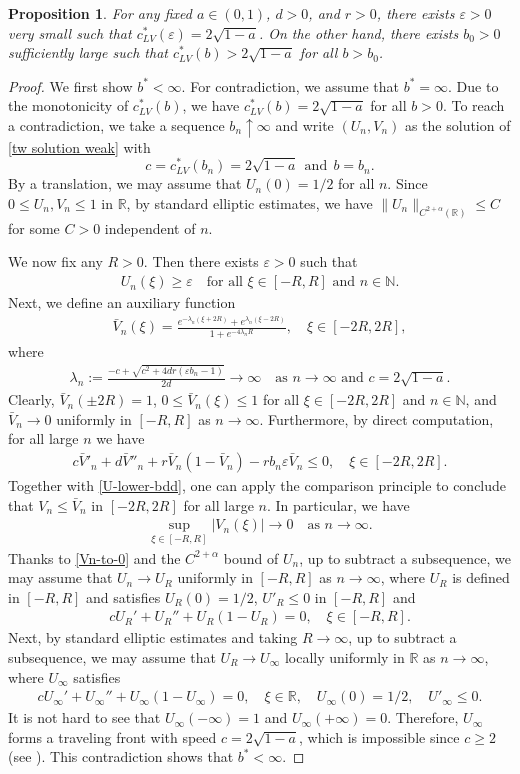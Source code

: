\documentclass[11pt,a4paper]{article}
\newtheorem{proposition}[theorem]{\textbf{Proposition}}
\numberwithin{equation}{section}
\numberwithin{figure}{section}
\newcommand\bea{\begin{eqnarray}}
\newcommand\eea{\end{eqnarray}}
\newcommand\beaa{\begin{eqnarray*}}
\newcommand\eeaa{\end{eqnarray*}}
\begin{document}
\begin{proposition}\label{prop:0<b*<infty}
For any fixed $a\in(0,1)$, $d>0$, and $r>0$, there exists $\varepsilon>0$ very small such that $c_{LV}^{*}(\varepsilon)=2\sqrt{1-a}$. On the other hand, there exists $b_0>0$ sufficiently large such that $c_{LV}^{*}(b)>2\sqrt{1-a}$ for all $b>b_0$.
\end{proposition}
\begin{proof}
We first show $b^*<\infty$.
For contradiction, we assume that $b^*=\infty$.
Due to the monotonicity of $c_{LV}^{*}(b)$, we have $c_{LV}^{*}(b)=2\sqrt{1-a}$ for all $b>0$.
To reach a contradiction, we take a sequence $b_n\uparrow \infty$ and write $(U_n,V_n)$ as the solution of \eqref{tw solution weak} with 
$$c=c_{LV}^{*}(b_n)=2\sqrt{1-a}\ \ \text{and}\ \ b=b_n.$$
By a translation, we may assume that $U_n(0)=1/2$ for all $n$.
Since $0\leq U_n,V_n\leq 1$ in $\mathbb{R}$, by standard elliptic estimates, we have
$\|U_n\|_{C^{2+\alpha}(\mathbb{R})}\leq C$ for some $C>0$ independent of $n$.

We now fix any $R>0$. Then there exists $\varepsilon>0$ such that
\bea\label{U-lower-bdd}
U_n(\xi)\geq \varepsilon\quad \mbox{for all $\xi\in[-R,R]$ and $n\in\mathbb{N}$}.
\eea
Next, we define an auxiliary function
\beaa
\bar{V}_n(\xi)=\frac{e^{-\lambda_n(\xi+2R)}+e^{\lambda_n(\xi-2R)}}{1+e^{-4\lambda_nR}},\quad \xi\in[-2R,2R],
\eeaa
where
\beaa
\lambda_n:=\frac{-c+\sqrt{c^2+4dr(\varepsilon b_n-1)}}{2d}\to\infty\quad\mbox{as $n\to\infty$ and $c=2\sqrt{1-a}$.}
\eeaa
Clearly, $\bar{V}_n(\pm 2R)=1$, $0\leq \bar{V}_n(\xi)\leq 1$ for all $\xi\in[-2R,2R]$ and $n\in\mathbb{N}$, and $\bar{V}_n\to0$ uniformly in $[-R,R]$ as $n\to\infty$.
Furthermore, by direct computation, for all large $n$ we have
\beaa
c\bar{V}'_n+d\bar{V}''_n+r\bar{V}_n(1-\bar{V}_n)-rb_n\varepsilon \bar{V}_n\leq 0,\quad \xi\in[-2R,2R].
\eeaa
Together with \eqref{U-lower-bdd}, one can apply the comparison principle to conclude that $V_n\leq \bar{V}_n$ in $[-2R,2R]$ for all large $n$. In particular, we have
\bea\label{Vn-to-0}
\sup_{\xi\in[-R,R]}|V_n(\xi)|\to0\quad \mbox{as $n\to\infty$}.
\eea
Thanks to \eqref{Vn-to-0} and the $C^{2+\alpha}$ bound of $U_n$, up to subtract a subsequence, we may assume that
$U_n\to U_{R}$ uniformly in $[-R,R]$ as $n\to\infty$,
where $U_{R}$ is defined in $[-R,R]$ and satisfies
$U_{R}(0)=1/2$, $U'_{R}\leq0$ in $[-R,R]$ and
\beaa
cU_R'+U_R''+U_R(1-U_R)=0, \quad \xi\in[-R,R].
\eeaa
Next, by standard elliptic estimates and taking $R\to\infty$, up to subtract a subsequence, we may assume that $U_R\to U_{\infty}$ locally uniformly in $\mathbb{R}$ as $n\to\infty$, where $U_{\infty}$ satisfies
\beaa
cU_{\infty}'+U_{\infty}''+U_{\infty}(1-U_{\infty})=0, \quad \xi\in\mathbb{R},\quad U_{\infty}(0)=1/2,\quad  U'_{\infty}\leq 0.
\eeaa
It is not hard to see that $U_{\infty}(-\infty)=1$ and $U_{\infty}(+\infty)=0$. Therefore, $U_{\infty}$ forms a traveling front with speed $c=2\sqrt{1-a}$,
which is impossible since $c\geq 2$ (see \cite{KPP}). This contradiction shows that $b^*<\infty$.



\end{proof}
\end{document}
